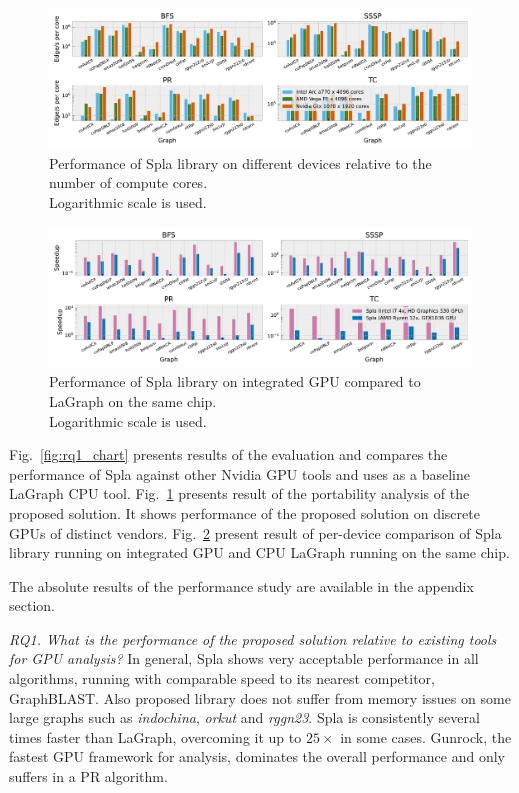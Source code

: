\begin{figure}[tbp]
\centering
\includegraphics[width=1.0\linewidth]{plots/rq2_cores.pdf}
\caption{Performance of Spla library on different devices relative to the number of compute cores.\\Logarithmic scale is used.}
\label{fig:rq2_chart}
\end{figure}

\begin{figure}[tbp]
\centering
\includegraphics[width=1.0\linewidth]{plots/rq3_int.pdf}
\caption{Performance of Spla library on integrated GPU compared to LaGraph on the same chip.\\Logarithmic scale is used.}
\label{fig:rq3_chart}
\end{figure}

Fig.~\ref{fig:rq1_chart} presents results of the evaluation and compares the performance of Spla against other Nvidia GPU tools and uses as a baseline LaGraph CPU tool. 
Fig.~\ref{fig:rq2_chart} presents result of the portability analysis of the proposed solution. It shows performance of the proposed solution on discrete GPUs of distinct vendors.
Fig.~\ref{fig:rq3_chart} present result of per-device comparison of Spla library running on integrated GPU and CPU LaGraph running on the same chip. 

The absolute results of the performance study are available in the appendix section.

\textit{RQ1. What is the performance of the proposed solution relative to existing tools for GPU analysis?} In general, Spla shows very acceptable performance in all algorithms, running with comparable speed to its nearest competitor, GraphBLAST. Also proposed library does not suffer from memory issues on some large graphs such as \textit{indochina}, \textit{orkut} and \textit{rggn23}. Spla is consistently several times faster than LaGraph, overcoming it up to $25\times$ in some cases. Gunrock, the fastest GPU framework for analysis, dominates the overall performance and only suffers in a PR algorithm.


